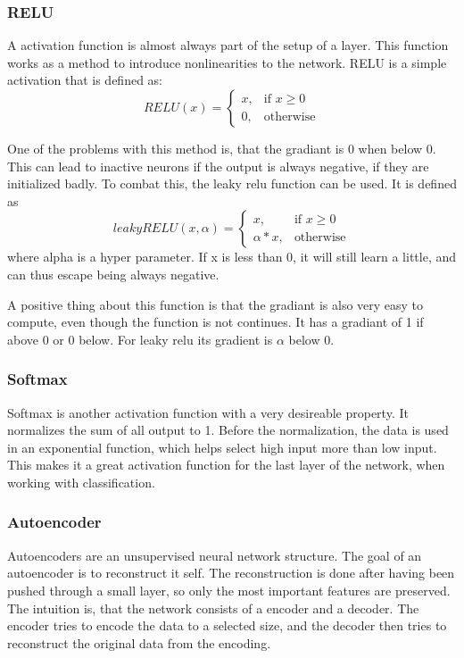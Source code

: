 \subsubsection{RELU} %
\label{ssub:relu}
A activation function is almost always part of the setup of a layer.
This function works as a method to introduce nonlinearities to the network.
RELU is a simple activation that is defined as: 
$$RELU(x) = \begin{cases}
    x,              & \text{if } x\geq 0\\
    0,              & \text{otherwise}
\end{cases}$$

One of the problems with this method is, that the gradiant is 0 when below 0.
This can lead to inactive neurons if the output is always negative, if they are initialized badly.
To combat this, the leaky relu function can be used.
It is defined as $$
leakyRELU(x, \alpha) = \begin{cases}
    x,              & \text{if } x\geq 0\\
    \alpha*x,       & \text{otherwise}
\end{cases}$$ 
where alpha is a hyper parameter.
If x is less than 0, it will still learn a little, and can thus escape being always negative.

A positive thing about this function is that the gradiant is also very easy to compute, even though the function is not continues.
It has a gradiant of 1 if above 0 or 0 below.
For leaky relu its gradient is $\alpha$ below 0.

\subsubsection{Softmax} %
\label{ssub:softmax}
Softmax is another activation function with a very desireable property.
It normalizes the sum of all output to 1.
Before the normalization, the data is used in an exponential function, which helps select high input more than low input.
This makes it a great activation function for the last layer of the network, when working with classification.

\subsubsection{Autoencoder} %
\label{ssub:autoencoder}
Autoencoders are an unsupervised neural network structure.
The goal of an autoencoder is to reconstruct it self.
The reconstruction is done after having been pushed through a small layer, so only the most important features are preserved.
The intuition is, that the network consists of a encoder and a decoder.
The encoder tries to encode the data to a selected size, and the decoder then tries to reconstruct the original data from the encoding.

